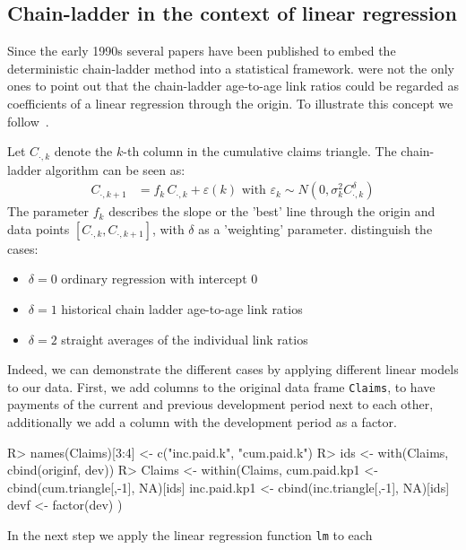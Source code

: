 \documentclass{article}
\begin{document}
\subsection{Chain-ladder in the context of linear regression}

Since the early 1990s several papers have been published to embed the
deterministic chain-ladder method into a statistical framework. 
\cite{ZehnwirthBarnettProceedings, DanielMurphy1994} were not the only ones to 
point out that the chain-ladder age-to-age link ratios could be regarded as 
coefficients of a linear regression through the origin. To illustrate this 
concept we follow~\cite{ZehnwirthBarnettProceedings}. 

Let $C_{\cdot,k}$ denote the $k$-th column in the cumulative claims triangle. 
The chain-ladder algorithm can be seen as: 
\begin{align}
 C_{\cdot,k + 1} &  = f_k\, C_{\cdot, k} + \varepsilon(k) \mbox{ with }
 \varepsilon_{k} \sim N(0, \sigma_k^2 C_{\cdot, k}^\delta)
\end{align}
The parameter $f_k$ describes the slope or the 'best' line through
the origin and data points $[C_{\cdot,k}, C_{\cdot, k+1}]$, with
$\delta$ as a 'weighting' parameter.  \cite{ZehnwirthBarnettProceedings}
distinguish the cases: 
\begin{itemize}
\item $\delta = 0$ ordinary regression with intercept $0$
\item $\delta = 1$ historical chain ladder age-to-age link ratios
\item $\delta = 2$ straight averages of the individual link ratios
\end{itemize}
Indeed, we can demonstrate the different cases by applying different
linear models to our data. First, we add columns to the original data
frame \texttt{Claims}, to have payments of the current and previous
development period next to each other, additionally we add a column with 
the development period as a factor.
\begin{Schunk}
\begin{Sinput}
R> names(Claims)[3:4] <- c("inc.paid.k", "cum.paid.k")
R> ids <- with(Claims, cbind(originf, dev))
R> Claims <- within(Claims,{
     cum.paid.kp1 <- cbind(cum.triangle[,-1], NA)[ids]
     inc.paid.kp1 <- cbind(inc.triangle[,-1], NA)[ids]
     devf <- factor(dev)
     }
   )
\end{Sinput}
\end{Schunk}
In the next step we apply the linear regression function \texttt{lm} to each 
\end{document}
